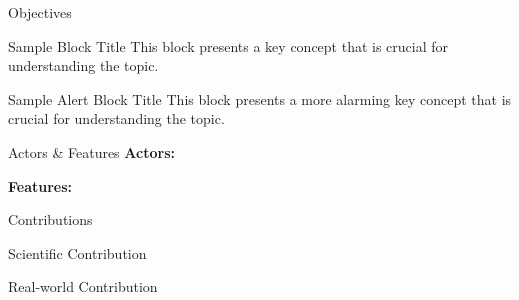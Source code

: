 \begin{frame}[label=objectives]{Objectives 
  \hyperlink{scope}{}
}
	\begin{block}{Sample Block Title}
		This block presents a \alert{key concept} that is crucial for understanding the topic.
	\end{block}
	\begin{alertblock}{Sample Alert Block Title}
		This block presents a more alarming \alert{key concept} that is crucial for understanding the topic.
	\end{alertblock}
	\note{}
\end{frame}

\begin{frame}{Actors \& Features}
	\textbf{Actors:}
									
	\textbf{Features:}
	\note{}
\end{frame}


\begin{frame}{Contributions}				
	\begin{block}{Scientific Contribution}
	\end{block}						
	\begin{block}{Real-world Contribution}
	\end{block}					
	\note{}
\end{frame}